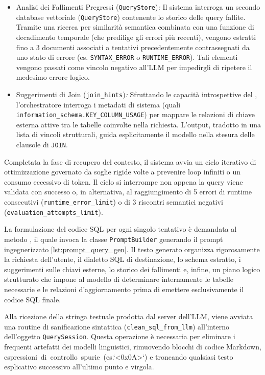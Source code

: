 \begin{itemize}
\item
  Analisi dei Fallimenti Pregressi (\texttt{QueryStore})\emph{:} Il
  sistema interroga un secondo database vettoriale (\texttt{QueryStore})
  contenente lo storico delle query fallite. Tramite una ricerca per
  similarità semantica combinata con una funzione di decadimento
  temporale (che predilige gli errori più recenti), vengono estratti
  fino a 3 documenti associati a tentativi precedentemente
  contrassegnati da uno stato di errore (es. \texttt{SYNTAX\_ERROR} o
  \texttt{RUNTIME\_ERROR}). Tali elementi vengono passati come vincolo
  negativo all'LLM per impedirgli di ripetere il medesimo errore logico.
\item
  Suggerimenti di Join (\texttt{join\_hints})\emph{:} Sfruttando le
  capacità introspettive del , l'orchestratore
  interroga i metadati di sistema (quali
  \texttt{information\_schema.KEY\_COLUMN\_USAGE}) per mappare le
  relazioni di chiave esterna attive tra le tabelle coinvolte nella
  richiesta. L'output, tradotto in una lista di vincoli strutturali,
  guida esplicitamente il modello nella stesura delle clausole di
  \texttt{JOIN}.
\end{itemize}

Completata la fase di recupero del contesto, il sistema avvia un ciclo
iterativo di ottimizzazione governato da soglie rigide volte a prevenire
loop infiniti o un consumo eccessivo di token. Il ciclo si interrompe
non appena la query viene validata con successo o, in alternativa, al
raggiungimento di 5 errori di runtime consecutivi
(\texttt{runtime\_error\_limit}) o di 3 riscontri semantici negativi
(\texttt{evaluation\_attempts\_limit}).

La formulazione del codice SQL per ogni singolo tentativo è
demandata al metodo , il quale
invoca la classe \texttt{PromptBuilder} generando il prompt
ingegnerizzato  \ref{lst:prompt_query_gen}. Il testo generato
organizza rigorosamente la richiesta dell'utente, il dialetto SQL
di destinazione, lo schema estratto, i suggerimenti sulle chiavi
esterne, lo storico dei fallimenti e, infine, un piano logico
strutturato che impone al modello di determinare internamente le
tabelle necessarie e le relazioni d'aggiornamento prima di emettere
esclusivamente il codice SQL finale.

Alla ricezione della stringa testuale prodotta dal server dell'LLM,
viene avviata una routine di sanificazione sintattica
(\texttt{clean\_sql\_from\_llm}) all'interno dell'oggetto
\texttt{QuerySession}. Questa operazione è necessaria per eliminare i
frequenti artefatti dei modelli linguistici, rimuovendo blocchi di
codice Markdown, espressioni\ di\ controllo\ spurie\ (es.`\textless0x0A\textgreater`)
e troncando qualsiasi testo esplicativo successivo all'ultimo punto e
virgola.

